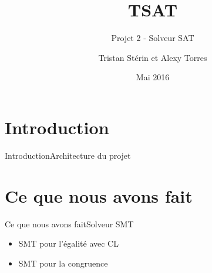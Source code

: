\documentclass{beamer}
\title{TSAT}
\subtitle{Projet 2 - Solveur SAT}
\author{Tristan Stérin et Alexy Torres}
\institute{ENS Lyon}
\date{Mai 2016}
\begin{document}
    \begin{frame}
        \titlepage
    \end{frame}
    
    \frame{\tableofcontents}

    \section{Introduction}
        \begin{frame}{Introduction}{Architecture du projet}
        \end{frame}
        
    \section{Ce que nous avons fait}

        \begin{frame}{Ce que nous avons fait}{Solveur SMT}
            \begin{itemize}
                \item SMT pour l'égalité avec CL
                \item SMT pour la congruence
            \end{itemize}
        \end{frame}
\end{document}
